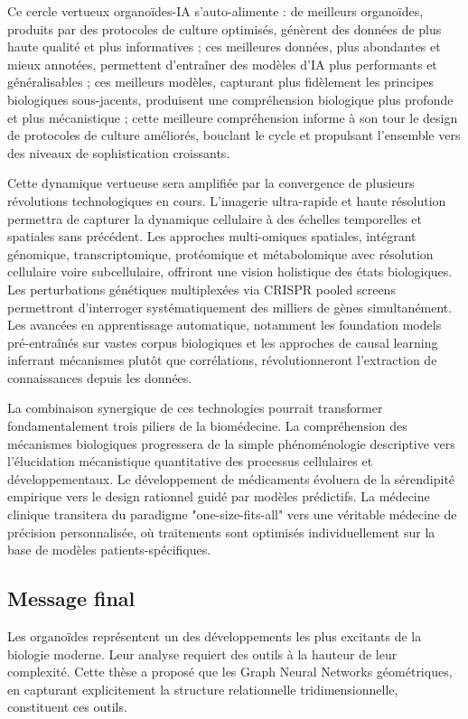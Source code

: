 Ce cercle vertueux organoïdes-IA s'auto-alimente : de meilleurs organoïdes, produits par des protocoles de culture optimisés, génèrent des données de plus haute qualité et plus informatives ; ces meilleures données, plus abondantes et mieux annotées, permettent d'entraîner des modèles d'IA plus performants et généralisables ; ces meilleurs modèles, capturant plus fidèlement les principes biologiques sous-jacents, produisent une compréhension biologique plus profonde et plus mécanistique ; cette meilleure compréhension informe à son tour le design de protocoles de culture améliorés, bouclant le cycle et propulsant l'ensemble vers des niveaux de sophistication croissants.

Cette dynamique vertueuse sera amplifiée par la convergence de plusieurs révolutions technologiques en cours. L'imagerie ultra-rapide et haute résolution permettra de capturer la dynamique cellulaire à des échelles temporelles et spatiales sans précédent. Les approches multi-omiques spatiales, intégrant génomique, transcriptomique, protéomique et métabolomique avec résolution cellulaire voire subcellulaire, offriront une vision holistique des états biologiques. Les perturbations génétiques multiplexées via CRISPR pooled screens permettront d'interroger systématiquement des milliers de gènes simultanément. Les avancées en apprentissage automatique, notamment les foundation models pré-entraînés sur vastes corpus biologiques et les approches de causal learning inferrant mécanismes plutôt que corrélations, révolutionneront l'extraction de connaissances depuis les données.

La combinaison synergique de ces technologies pourrait transformer fondamentalement trois piliers de la biomédecine. La compréhension des mécanismes biologiques progressera de la simple phénoménologie descriptive vers l'élucidation mécanistique quantitative des processus cellulaires et développementaux. Le développement de médicaments évoluera de la sérendipité empirique vers le design rationnel guidé par modèles prédictifs. La médecine clinique transitera du paradigme "one-size-fits-all" vers une véritable médecine de précision personnalisée, où traitements sont optimisés individuellement sur la base de modèles patients-spécifiques.

\subsection{Message final}

Les organoïdes représentent un des développements les plus excitants de la biologie moderne. Leur analyse requiert des outils à la hauteur de leur complexité. Cette thèse a proposé que les Graph Neural Networks géométriques, en capturant explicitement la structure relationnelle tridimensionnelle, constituent ces outils.

